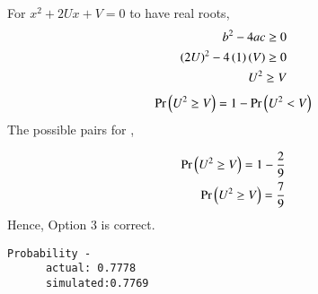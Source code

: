 \documentclass[journal,12pt,twocolumn]{IEEEtran}
\begin{document}
For $x^2+2U x+V=0$ to have real roots,
\begin{align}
    b^2-4ac\geq0\\
    \left(2U\right)^2-4\left(1\right)\left(V\right)\geq0\\
    U^2\geq V
\end{align}
\begin{align}
    \Pr\left(U^2\geq V\right)=1-\Pr\left(U^2<V\right)
\end{align}
The possible pairs  for ,
\vspace{0.00001in}
\begin{table}[h!]
\centering
\caption{Table for }
\label{Table3}
\end{table}
\begin{align}
    \Pr\left(U^2\geq V\right)=1-\frac{2}{9}\\
    \Pr\left(U^2\geq V\right)=\frac{7}{9}
\end{align}
Hence, Option 3 is correct.
\begin{lstlisting}
Probability -
      actual: 0.7778
      simulated:0.7769
\end{lstlisting}
\end{document}
